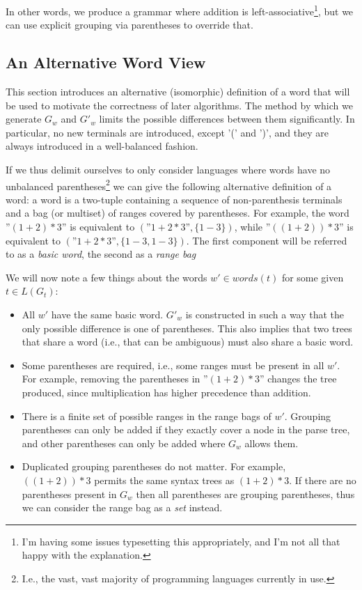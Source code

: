 \documentclass[sigplan]{acmart}\settopmatter{printfolios=true,printccs=false,printacmref=false}
\newcommand{\words}{\mathit{words}} %
\newcommand{\range}[2]{#1\!-\!#2}
\begin{document}
\noindent In other words, we produce a grammar where addition is left-associative\footnote{I'm having some issues typesetting this appropriately, and I'm not all that happy with the explanation.}, but we can use explicit grouping via parentheses to override that.

\subsection{An Alternative Word View} \label{sec:word-view}

This section introduces an alternative (isomorphic) definition of a word that will be used to motivate the correctness of later algorithms. The method by which we generate $G_w$ and $G'_w$ limits the possible differences between them significantly. In particular, no new terminals are introduced, except '(' and ')', and they are always introduced in a well-balanced fashion.

If we thus delimit ourselves to only consider languages where words have no unbalanced parentheses\footnote{I.e., the vast, vast majority of programming languages currently in use.} we can give the following alternative definition of a word: a word is a two-tuple containing a sequence of non-parenthesis terminals and a bag (or multiset) of ranges covered by parentheses. For example, the word ''$(1 + 2) * 3$'' is equivalent to $(\text{''}1 + 2 * 3\text{''}, \{\range{1}{3}\})$, while ''$((1 + 2)) * 3$'' is equivalent to $(\text{''}1 + 2 * 3\text{''}, \{\range{1}{3}, \range{1}{3}\})$. The first component will be referred to as a \emph{basic word}, the second as a \emph{range bag}

We will now note a few things about the words $w' \in \words(t)$ for some given $t \in L(G_t)$:

\begin{itemize}
\item All $w'$ have the same basic word. $G'_w$ is constructed in such a way that the only possible difference is one of parentheses. This also implies that two trees that share a word (i.e., that can be ambiguous) must also share a basic word.
\item Some parentheses are required, i.e., some ranges must be present in all $w'$. For example, removing the parentheses in ''$(1 + 2) * 3$'' changes the tree produced, since multiplication has higher precedence than addition.
\item There is a finite set of possible ranges in the range bags of $w'$. Grouping parentheses can only be added if they exactly cover a node in the parse tree, and other parentheses can only be added where $G_w$ allows them.
\item Duplicated grouping parentheses do not matter. For example, $((1 + 2)) * 3$ permits the same syntax trees as $(1 + 2) * 3$. If there are no parentheses present in $G_w$ then all parentheses are grouping parentheses, thus we can consider the range bag as a \emph{set} instead.
\end{itemize}
\end{document}

